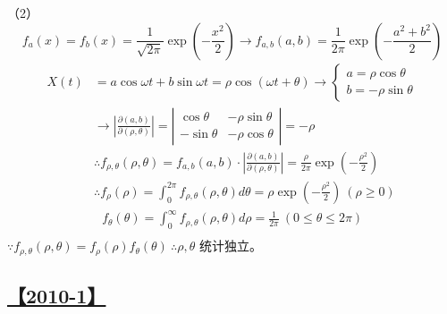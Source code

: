 （2）
\begin{equation}
f_a(x)=f_b(x)=\frac{1}{\sqrt{2\pi}}\exp{\left(-\frac{x^2}{2}\right)}\rightarrow f_{a, b}(a, b)=\frac{1}{2\pi}\exp{\left(-\frac{a^2+b^2}{2}\right)}
\tag*{}
\end{equation}
\begin{equation}
\begin{split}
X(t)&=a \cos\omega t + b \sin\omega t=\rho\cos(\omega t+\theta)\rightarrow \begin{cases}a=\rho\cos\theta\\b=-\rho\sin\theta\end{cases}\\
&\rightarrow\left|\frac{\partial(a, b)}{\partial(\rho, \theta)}\right|=\left|\begin{matrix}\cos\theta&-\rho\sin\theta\\-\sin\theta&-\rho\cos\theta\end{matrix}\right|=-\rho\\
&\therefore f_{\rho, \theta}(\rho, \theta)=f_{a, b}(a, b)\cdot\left|\frac{\partial(a, b)}{\partial(\rho, \theta)}\right|=\frac{\rho}{2\pi}\exp\left(-\frac{\rho^2}{2}\right)\\
&\therefore f_\rho(\rho)=\int_0^{2\pi}f_{\rho, \theta}(\rho, \theta)d\theta=\rho\exp\left(-\frac{\rho^2}{2}\right)\ (\rho\geq0)\\
&\ \ \ f_\theta(\theta)=\int_0^{\infty}f_{\rho, \theta}(\rho, \theta)d\rho=\frac{1}{2\pi}\ (0\leq\theta\leq2\pi)\\
\end{split}
\tag*{}
\end{equation}
$\because f_{\rho, \theta}(\rho, \theta)=f_\rho(\rho)f_\theta(\theta)\ \therefore \rho, \theta$ 统计独立。

\subsection{\hyperref[Q2010-1]{【2010-1】}}\label{A2010-1}

